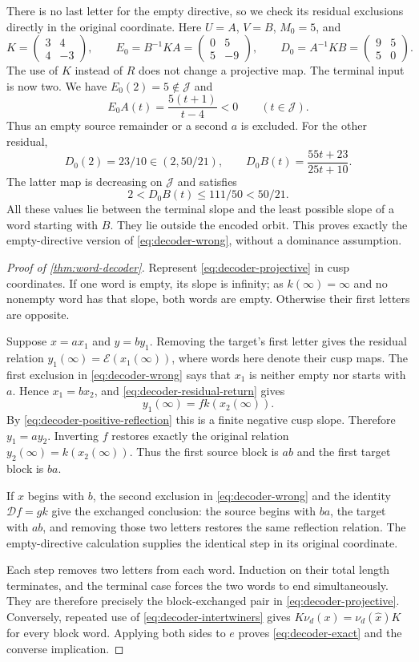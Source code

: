 There is no last letter for the empty directive, so we check its
residual exclusions directly in the original coordinate. Here
$U=A$, $V=B$, $M_0=5$, and
$$
 K=\begin{pmatrix}3&4\\4&-3\end{pmatrix},\qquad
 E_0=B^{-1}KA=\begin{pmatrix}0&5\\5&-9\end{pmatrix},\qquad
 D_0=A^{-1}KB=\begin{pmatrix}9&5\\5&0\end{pmatrix}.
$$
The use of $K$ instead of $R$ does not change a projective map.
The terminal input is now two. We have $E_0(2)=5\notin \mathcal J$ and
$$
 E_0A(t)=\frac{5(t+1)}{t-4}<0\qquad(t\in\mathcal J).
$$
Thus an empty source remainder or a second $a$ is excluded.
For the other residual,
$$
 D_0(2)=23/10\in(2,50/21),\qquad
 D_0B(t)=\frac{55t+23}{25t+10}.
$$
The latter map is decreasing on $\mathcal J$ and satisfies
$$
 2<D_0B(t)\leqslant111/50<50/21.
$$
All these values lie between the terminal slope and the least
possible slope of a word starting with $B$. They lie outside the
encoded orbit. This proves exactly the empty-directive version
of \eqref{eq:decoder-wrong}, without a dominance assumption.

\begin{proof}[Proof of \cref{thm:word-decoder}]
Represent \eqref{eq:decoder-projective} in cusp coordinates.
If one word is empty, its slope is infinity; as $k(\infty)=\infty$
and no nonempty word has that slope, both words are empty.
Otherwise their first letters are opposite.

Suppose $x=ax_1$ and $y=by_1$. Removing the target's first
letter gives the residual relation
$y_1(\infty)=\mathcal E(x_1(\infty))$, where words here denote
their cusp maps. The first exclusion in
\eqref{eq:decoder-wrong} says that $x_1$ is neither empty nor
starts with $a$. Hence $x_1=bx_2$, and
\eqref{eq:decoder-residual-return} gives
$$
 y_1(\infty)=fk(x_2(\infty)).
$$
By \eqref{eq:decoder-positive-reflection} this is a finite negative
cusp slope. Therefore $y_1=ay_2$. Inverting $f$ restores
exactly the original relation
$y_2(\infty)=k(x_2(\infty))$.
Thus the first source block is $ab$ and the first target block
is $ba$.

If $x$ begins with $b$, the second exclusion in
\eqref{eq:decoder-wrong} and the identity $\mathcal Df=gk$
give the exchanged conclusion: the source begins with $ba$,
the target with $ab$, and removing those two letters restores
the same reflection relation. The empty-directive calculation
supplies the identical step in its original coordinate.

Each step removes two letters from each word. Induction on their
total length terminates, and the terminal case forces the two
words to end simultaneously. They are therefore precisely
the block-exchanged pair in \eqref{eq:decoder-projective}.
Conversely, repeated use of \eqref{eq:decoder-intertwiners} gives
$K\nu_d(x)=\nu_d(\widehat{x})K$ for every block word.
Applying both sides to $e$ proves \eqref{eq:decoder-exact} and
the converse implication.
\end{proof}

